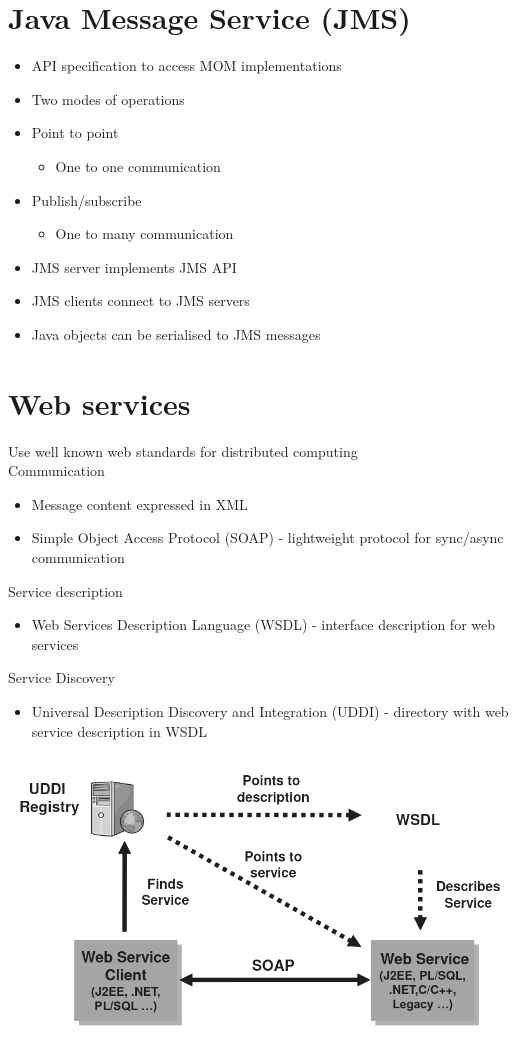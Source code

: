 \documentclass{article}[18pt]
\begin{document}
\section{Java Message Service (JMS)}
\begin{itemize}
	\item API specification to access MOM implementations
	\item Two modes of operations 
	\item Point to point
	\begin{itemize}
		\item One to one communication
	\end{itemize}
	\item Publish/subscribe
	\begin{itemize}
		\item One to many communication
	\end{itemize}
	\item JMS server implements JMS API 
	\item JMS clients connect to JMS servers
	\item Java objects can be serialised to JMS messages
\end{itemize}
\section{Web services}
Use well known web standards for distributed computing\\
Communication
\begin{itemize}
	\item Message content expressed in XML
	\item Simple Object Access Protocol (SOAP) - lightweight protocol for sync/async communication
\end{itemize}
Service description
\begin{itemize}
	\item Web Services Description Language (WSDL) - interface description for web services
\end{itemize}
Service Discovery
\begin{itemize}
	\item Universal Description Discovery and Integration (UDDI) - directory with web service description in WSDL
\end{itemize}

\begin{center}
	\includegraphics[scale=0.5]{"Web Services"}
\end{center}
\end{document}
